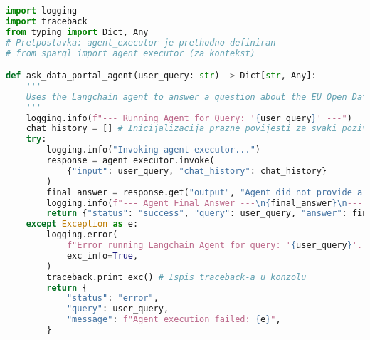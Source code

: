 \begin{lstlisting}[language=Python, caption=Glavna funkcija za pokretanje agenta (\texttt{ask\_data\_portal\_agent}), label=lst:ask_data_portal_agent_sparql_py, basicstyle=\footnotesize\ttfamily, breaklines=true, morekeywords={logging, traceback, Dict, Any}]
import logging
import traceback
from typing import Dict, Any
# Pretpostavka: agent_executor je prethodno definiran
# from sparql import agent_executor (za kontekst)

def ask_data_portal_agent(user_query: str) -> Dict[str, Any]:
    '''
    Uses the Langchain agent to answer a question about the EU Open Data Portal.
    '''
    logging.info(f"--- Running Agent for Query: '{user_query}' ---")
    chat_history = [] # Inicijalizacija prazne povijesti za svaki poziv
    try:
        logging.info("Invoking agent executor...")
        response = agent_executor.invoke(
            {"input": user_query, "chat_history": chat_history}
        )
        final_answer = response.get("output", "Agent did not provide a final output.")
        logging.info(f"--- Agent Final Answer ---\n{final_answer}\n--------------------------")
        return {"status": "success", "query": user_query, "answer": final_answer}
    except Exception as e:
        logging.error(
            f"Error running Langchain Agent for query: '{user_query}'. Error: {e}",
            exc_info=True,
        )
        traceback.print_exc() # Ispis traceback-a u konzolu
        return {
            "status": "error",
            "query": user_query,
            "message": f"Agent execution failed: {e}",
        }
\end{lstlisting}

